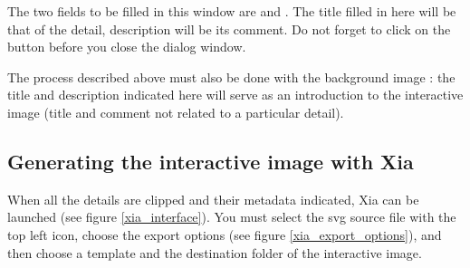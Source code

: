 The two fields to be filled in this window are  and 
.  The title filled in here will be that of the detail, 
description will be its comment. Do not forget to click on the 
button before you close the  dialog window.

The process described above must also be done with the background image : 
the title and description indicated here will serve as an introduction to 
the interactive image (title and comment not related to a particular detail).

\subsection{Generating the interactive image with Xia}

When all the details are clipped and their metadata indicated, Xia can be launched (see figure \ref{xia_interface}).
You must select the svg source file with the top left icon,
choose the export options (see figure \ref{xia_export_options}), and then choose a 
template and the destination folder of the interactive image.

